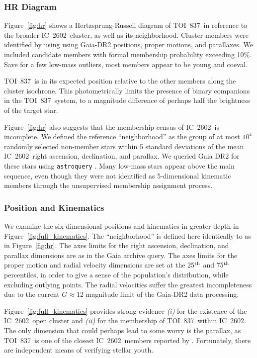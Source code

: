 \documentclass[12pt,twocolumn,tighten]{aastex63}
\newcommand{\tn}{TOI~837} %
\newcommand{\cn}{IC~2602} %
\begin{document}
\subsubsection{HR Diagram}

Figure~\ref{fig:hr} shows a Hertzsprung-Russell diagram of \tn\ in
reference to the broader \cn\ cluster, as well as its neighborhood.
Cluster members were identified by \citet{cantatgaudin_gaia_2018}
using using Gaia-DR2 positions, proper motions, and parallaxes.  
We included candidate members with formal membership probability
exceeding 10\%.  Save for a few low-mass outliers, most members appear
to be young and coeval.

\tn\ is in its expected position relative to the other members along
the cluster isochrone.  This photometrically limits the presence of
binary companions in the \tn\ system, to a magnitude difference of
perhaps half the brightness of the target star.

Figure~\ref{fig:hr} also suggests that the membership census of \cn\
is incomplete.  We defined the reference ``neighborhood'' as the group
of at most $10^4$ randomly selected non-member stars within 5 standard
deviations of the mean \cn\ right ascension, declination, and
parallax.  We queried Gaia DR2 for these stars using
\texttt{astroquery} \citep{astroquery_2018}.  Many low-mass stars
appear above the main sequence, even though they were not identified
as 5-dimensional kinematic members through the unsupervised
\citet{cantat-gaudin_gaia_2018} membership assignment process.


\subsubsection{Position and Kinematics}

We examine the six-dimensional positions and kinematics in greater
depth in Figure~\ref{fig:full_kinematics}.  The ``neighborhood'' is
defined here identically to as in Figure~\ref{fig:hr}.  The axes
limits for the right ascension, declination, and parallax dimensions
are as in the Gaia archive query.  The axes limits for the proper
motion and radial velocity dimensions are set at the 25$^{\rm th}$ and
75$^{\rm th}$ percentiles, in order to give a sense of the
population's distribution, while excluding outlying points.  The
radial velocities suffer the greatest incompleteness due to the
current $G\approx12$ magnitude limit of the Gaia-DR2 data processing.

Figure~\ref{fig:full_kinematics} provides strong evidence {\it (i)} for the
existence of the \cn\ open cluster and {\it (ii)} for the membership
of \tn\ within \cn.
The only dimension that could perhaps lead to some worry is the
parallax, as \tn\ is one of the closest \cn\ members reported by
\citet{cantatgaudin_gaia_2018}.
Fortunately, there are independent means of verifying stellar youth.
\end{document}

